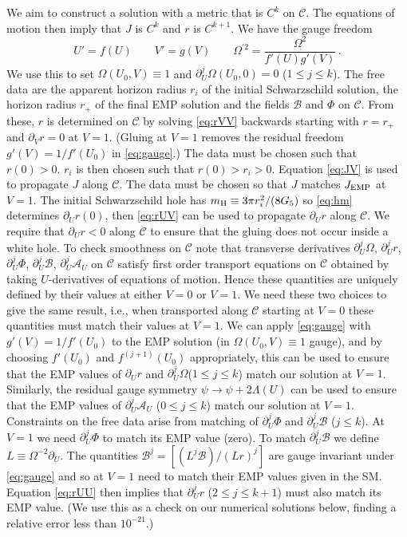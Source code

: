 \documentclass[prl,twocolumn,superscriptaddress,nofootinbib]{revtex4-2}
\begin{document}
We aim to construct a solution with a metric that is $C^k$ on $\mathcal{C}$. The equations of motion then imply that $J$ is $C^k$ and $r$ is $C^{k+1}$. We have the gauge freedom
\begin{equation}
\label{eq:gauge}
 U' = f(U) \qquad V' = g(V) \qquad \Omega^{'2} = \frac{\Omega^2}{f'(U) g'(V)}\,.
\end{equation}
We use this to set $\Omega(U_0,V) \equiv 1$ and $\partial_U^j \Omega(U_0,0)=0$ ($1 \le j \le k$). The free data are the apparent horizon radius $r_i$ of the initial Schwarzschild solution, the horizon radius $r_+$ of the final EMP solution and the fields $\mathcal{B}$ and $\Phi$ on $\mathcal{C}$. From these, $r$ is determined on $\mathcal{C}$ by solving \eqref{eq:rVV} backwards starting with $r=r_+$ and $\partial_V r=0$ at $V=1$. (Gluing at $V=1$ removes the residual freedom $g'(V) = 1/f'(U_0)$ in \eqref{eq:gauge}.) The data must be chosen such that $r(0)>0$. $r_i$ is then chosen such that $r(0)>r_i>0$. Equation \eqref{eq:JV} is used to propagate $J$ along $\mathcal{C}$. The data must be chosen so that $J$ matches $J_{\rm EMP}$ at $V=1$. The initial Schwarzschild hole has $m_{\rm H} \equiv 3\pi r_i^2/(8 G_5)$ so \eqref{eq:hm} determines $\partial_U r(0)$, then \eqref{eq:rUV} can be used to propagate $\partial_U r$ along $\mathcal{C}$. We require that $\partial_U r<0$ along $\mathcal{C}$ to ensure that the gluing does not occur inside a white hole. To check smoothness on $\mathcal{C}$ note that transverse derivatives $\partial^j_U \Omega$, $\partial^j_U r$, $\partial_U^j \Phi$, $\partial_U^j \mathcal{B}$, $\partial_U^j \mathcal{A}_U$ on $\mathcal{C}$ satisfy first order transport equations on $\mathcal{C}$ obtained by taking $U$-derivatives of equations of motion. Hence these quantities are  uniquely defined by their values at either $V=0$ or $V=1$. We need these two choices to give the same result, i.e., when transported along $\mathcal{C}$ starting at $V=0$ these quantities must match their values at $V=1$. We can apply \eqref{eq:gauge} with $g'(V)=1/f'(U_0)$ to the EMP solution (in $\Omega(U_0,V) \equiv 1$ gauge), and by choosing $f'(U_0)$ and $f^{(j+1)}(U_0)$ appropriately, this can be used to ensure that the EMP values of $\partial_U r$ and $\partial_U^j \Omega$($1\le j \le k$) match our solution at $V=1$. Similarly, the residual gauge symmetry $\psi \rightarrow \psi + 2\Lambda(U)$ can be used to ensure that the EMP values of $\partial^j_U \mathcal{A}_U$ ($0 \le j \le k$) match our solution at $V=1$. Constraints on the free data arise from matching of $\partial_U^j \Phi$ and $\partial_U^j \mathcal{B}$ ($j \le k$). At $V=1$ we need $\partial_U^j \Phi$ to match its EMP value (zero). To match $\partial_U^j \mathcal{B}$ we define $L \equiv \Omega^{-2} \partial_U$. The quantities $\mathcal{B}^j = [(L^j \mathcal{B})/(L r)^j]$ are gauge invariant under \eqref{eq:gauge} and so at $V=1$ need to match their EMP values given in the SM. Equation \eqref{eq:rUU} then implies that $\partial_U^j r$ ($2 \le j \le k+1$) must also match its EMP value. (We use this as a check on our numerical solutions below, finding a relative error less than $10^{-21}$.)
\end{document}
